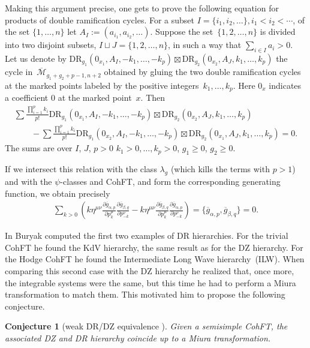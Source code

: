 \documentclass[pdftex]{sigma}
\numberwithin{equation}{section}
\newtheorem{Conjecture}[Theorem]{Conjecture}
\newcommand{\oM}{\overline{\mathcal M}}
\newcommand{\og}{\overline g}
\def\d{{\partial}}
\newcommand{\<}{\left<}
\renewcommand{\>}{\right>}
\newcommand{\DR}{\mathrm{DR}}
\begin{document}
Making this argument precise, one gets to prove the following equation for products of double ramif\/ication cycles. For a subset $I=\{i_1,i_2,\dots\}, i_1<i_2<\cdots$, of the set $\{1,\dots,n\}$ let $A_I:=(a_{i_1},a_{i_2},\dots)$.
Suppose the set~$\{1,2,\dots,n\}$ is divided into two disjoint subsets, $I\sqcup J=\{1,2,\dots,n\}$, in such a way that $\sum\limits_{i\in I} a_i>0$. Let us denote by $\DR_{g_1}(0_{x_1},A_I,-k_1, \dots, -k_p)\boxtimes \DR_{g_2}(0_{x_2},A_J, k_1, \dots, k_p)$ the cycle in~$\oM_{g_1+g_2+p-1,n+2}$ obtained by gluing the two double rami\-f\/i\-ca\-tion cycles at the marked points labeled by the positive integers~$k_1,\dots,k_p$. Here $0_{x}$ indicates a coef\/f\/icient $0$ at the marked point~$x$. Then
\begin{gather}
\sum \frac{\prod\limits_{i=1}^p k_i}{p!}
\DR_{g_1}(0_{x_1},A_I,-k_1, \dots, -k_p)\boxtimes \DR_{g_2}(0_{x_2},A_J, k_1, \dots, k_p)\nonumber\\
\qquad{} - \sum \frac{\prod\limits_{i=1}^p k_i}{p!}
\DR_{g_1}(0_{x_2},A_I,-k_1, \dots, -k_p) \boxtimes \DR_{g_2}(0_{x_1},A_J, k_1, \dots, k_p)=0.\label{eq:DRcomm}
\end{gather}
The sums are over $I$, $J$, $p>0$ $k_1>0,\dots,k_p>0$, $g_1\ge 0$, $g_2\ge 0$.

If we intersect this relation with the class $\lambda_g$ (which kills the terms with $p>1$) and with the $\psi$-classes and CohFT, and form the corresponding generating function, we obtain precisely \begin{gather*}\sum_{k>0}\left( k \eta^{\mu\nu}\frac{\d \og_{\alpha,p}}{\d p^\mu_k} \frac{\d \og_{\beta,q}}{\d p^\nu_{-k}} - k \eta^{\mu\nu}\frac{\d \og_{\beta,q}}{\d p^\mu_k} \frac{\d \og_{\alpha,p}}{\d p^\nu_{-k}}\right)=\big\{\og_{\alpha,p},\og_{\beta,q}\big\}=0.\end{gather*}

In \cite{Bur15} Buryak computed the f\/irst two examples of DR hierarchies. For the trivial CohFT he found the KdV hierarchy, the same result as for the DZ hierarchy. For the Hodge CohFT he found the Intermediate Long Wave hierarchy~(ILW). When comparing this second case with the DZ hierarchy he realized that, once more, the integrable systems were the same, but this time he had to perform a Miura transformation to match them. This motivated him to propose the following conjecture.

\begin{Conjecture}[weak DR/DZ equivalence \cite{Bur15}]
Given a semisimple CohFT, the associated DZ and DR hierarchy coincide up to a Miura transformation.
\end{Conjecture}
\end{document}
